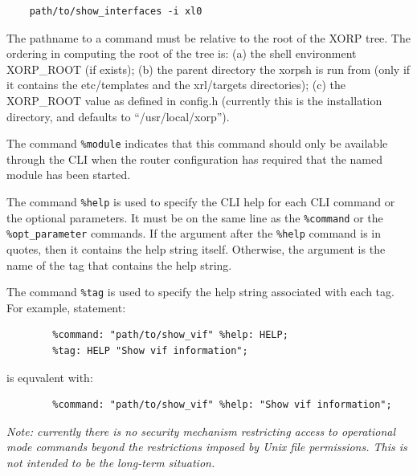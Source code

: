 \documentclass[11pt]{article}
\begin{document}
\begin{verbatim}
    path/to/show_interfaces -i xl0
\end{verbatim}

The pathname to a command must be
relative to the root of the XORP tree. The ordering in computing the root of
the tree is: (a) the shell environment XORP\_ROOT (if exists); (b) the parent
directory the xorpsh is run from (only if it contains the
etc/templates and the xrl/targets directories); (c) the XORP\_ROOT value as
defined in config.h (currently this is the installation directory, and
defaults to ``/usr/local/xorp'').

The command {\tt \%module} indicates that this command should only be
available through the CLI when the router configuration has required
that the named module has been started.

The command {\tt \%help} is used to specify the CLI help for each
CLI command or the optional parameters.
It must be on the same line as the {\tt \%command} or the
{\tt \%opt\_parameter} commands. If the argument after the {\tt \%help}
command is in quotes, then it contains the help string itself.
Otherwise, the argument is the name of the tag that contains the help
string.

The command {\tt \%tag} is used to specify the help string associated
with each tag. For example, statement:

\begin{verbatim}
        %command: "path/to/show_vif" %help: HELP;
        %tag: HELP "Show vif information";
\end{verbatim}

is equvalent with:

\begin{verbatim}
        %command: "path/to/show_vif" %help: "Show vif information";
\end{verbatim}

\textit{Note: currently there is no security mechanism restricting
access to operational mode commands beyond the restrictions imposed by
Unix file permissions.  This is not intended to be the long-term
situation.}
\end{document}
